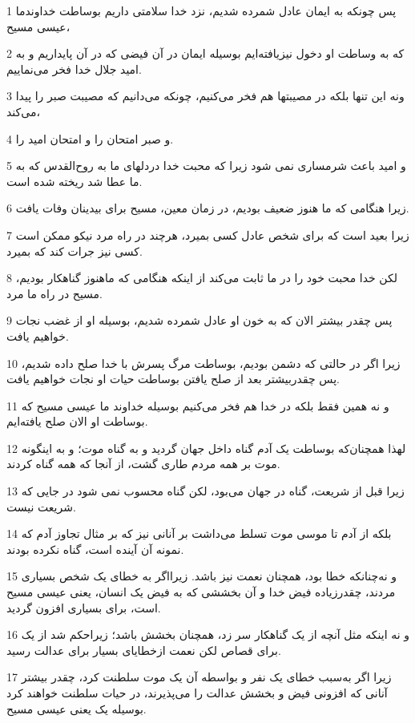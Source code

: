 \par 1 پس چونکه به ایمان عادل شمرده شدیم، نزد خدا سلامتی داریم بوساطت خداوندما عیسی مسیح،
\par 2 که به وساطت او دخول نیزیافته‌ایم بوسیله ایمان در آن فیضی که در آن پایداریم و به امید جلال خدا فخر می‌نماییم.
\par 3 ونه این تنها بلکه در مصیبتها هم فخر می‌کنیم، چونکه می‌دانیم که مصیبت صبر را پیدا می‌کند،
\par 4 و صبر امتحان را و امتحان امید را.
\par 5 و امید باعث شرمساری نمی شود زیرا که محبت خدا دردلهای ما به روح‌القدس که به ما عطا شد ریخته شده است.
\par 6 زیرا هنگامی که ما هنوز ضعیف بودیم، در زمان معین، مسیح برای بیدینان وفات یافت.
\par 7 زیرا بعید است که برای شخص عادل کسی بمیرد، هرچند در راه مرد نیکو ممکن است کسی نیز جرات کند که بمیرد.
\par 8 لکن خدا محبت خود را در ما ثابت می‌کند از اینکه هنگامی که ماهنوز گناهکار بودیم، مسیح در راه ما مرد.
\par 9 پس چقدر بیشتر الان که به خون او عادل شمرده شدیم، بوسیله او از غضب نجات خواهیم یافت.
\par 10 زیرا اگر در حالتی که دشمن بودیم، بوساطت مرگ پسرش با خدا صلح داده شدیم، پس چقدربیشتر بعد از صلح یافتن بوساطت حیات او نجات خواهیم یافت.
\par 11 و نه همین فقط بلکه در خدا هم فخر می‌کنیم بوسیله خداوند ما عیسی مسیح که بوساطت او الان صلح یافته‌ایم.
\par 12 لهذا همچنان‌که بوساطت یک آدم گناه داخل جهان گردید و به گناه موت؛ و به اینگونه موت بر همه مردم طاری گشت، از آنجا که همه گناه کردند.
\par 13 زیرا قبل از شریعت، گناه در جهان می‌بود، لکن گناه محسوب نمی شود در جایی که شریعت نیست.
\par 14 بلکه از آدم تا موسی موت تسلط می‌داشت بر آنانی نیز که بر مثال تجاوز آدم که نمونه آن آینده است، گناه نکرده بودند.
\par 15 و نه‌چنانکه خطا بود، همچنان نعمت نیز باشد. زیرااگر به خطای یک شخص بسیاری مردند، چقدرزیاده فیض خدا و آن بخششی که به فیض یک انسان، یعنی عیسی مسیح است، برای بسیاری افزون گردید.
\par 16 و نه اینکه مثل آنچه از یک گناهکار سر زد، همچنان بخشش باشد؛ زیراحکم شد از یک برای قصاص لکن نعمت ازخطایای بسیار برای عدالت رسید.
\par 17 زیرا اگر به‌سبب خطای یک نفر و بواسطه آن یک موت سلطنت کرد، چقدر بیشتر آنانی که افزونی فیض و بخشش عدالت را می‌پذیرند، در حیات سلطنت خواهند کرد بوسیله یک یعنی عیسی مسیح.
